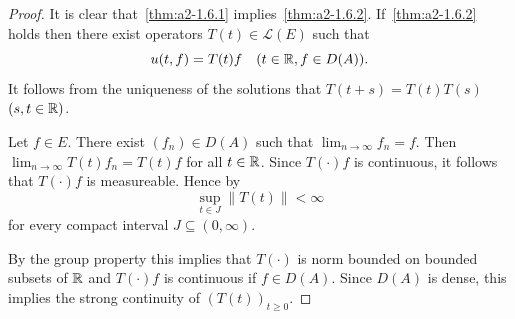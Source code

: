 \begin{proof}
It is clear that~\ref{thm:a2-1.6.1} implies~\ref{thm:a2-1.6.2}. 
If~\ref{thm:a2-1.6.2}   holds then there exist operators $T(t) \in \mathcal{L}(E)$ such that 
%
\[
	u(t,f) = T(t)f \quad (t \in \mathbb{R}, f \in D(A)) .
\]
%
It follows from the uniqueness of the solutions that $T(t+s) = T(t)T(s)$ $(s,t \in \mathbb{R})$.

Let $f \in E$. 
There exist $(f_{n}) \in D(A)$ such that $\lim_{n \to \infty} f_{n} = f$.
Then $\lim_{n \to \infty} T(t)f_{n} = T(t)f$ for all $t \in \mathbb{R}$.
Since $T(\cdot)f$ is continuous, it follows that $T(\cdot)f$ is measureable.
Hence by \textcite[10.2.1]{hillephillips:1957} 
%
\[
	\sup_{t \in J}\|T(t)\| < \infty
\]
%
for every compact interval $J \subseteq (0,\infty)$.

By the group property this implies that $T(\cdot)$ is norm bounded on bounded subsets of\/ $\mathbb{R}$ and
$T(\cdot)f$ is continuous if\/ $f \in D(A)$.
Since $D(A)$ is dense, this implies the strong continuity of\/ $(T(t))_{t \geq 0}$.
\end{proof}
